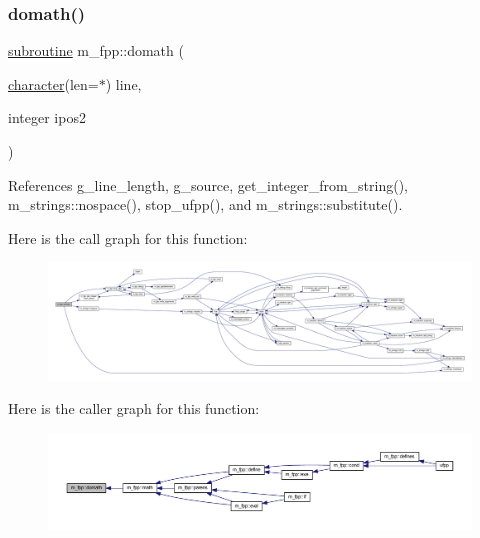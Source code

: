 \subsubsection{\texorpdfstring{domath()}{domath()}}
{\footnotesize\ttfamily \hyperlink{M__stopwatch_83_8txt_acfbcff50169d691ff02d4a123ed70482}{subroutine} m\+\_\+fpp\+::domath (\begin{DoxyParamCaption}\item[{\hyperlink{option__stopwatch_83_8txt_abd4b21fbbd175834027b5224bfe97e66}{character}(len=$\ast$)}]{line,  }\item[{integer}]{ipos2 }\end{DoxyParamCaption})}



References g\+\_\+line\+\_\+length, g\+\_\+source, get\+\_\+integer\+\_\+from\+\_\+string(), m\+\_\+strings\+::nospace(), stop\+\_\+ufpp(), and m\+\_\+strings\+::substitute().

Here is the call graph for this function\+:
\nopagebreak
\begin{figure}[H]
\begin{center}
\leavevmode
\includegraphics[width=350pt]{namespacem__fpp_acf16ae34a4c7e769114656c3dbbe0640_cgraph}
\end{center}
\end{figure}
Here is the caller graph for this function\+:
\nopagebreak
\begin{figure}[H]
\begin{center}
\leavevmode
\includegraphics[width=350pt]{namespacem__fpp_acf16ae34a4c7e769114656c3dbbe0640_icgraph}
\end{center}
\end{figure}
\mbox{\label{namespacem__fpp_a56d098fa1c69f9afbfbf0aacceed9fff}} 
